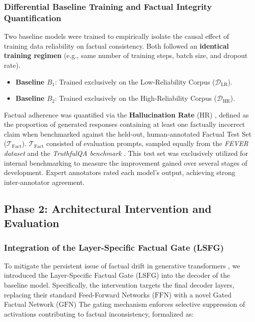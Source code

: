 \subsubsection{Differential Baseline Training and Factual Integrity Quantification}
\label{sec:baseline_training_quantification}
Two baseline models were trained to empirically isolate the causal effect of training data reliability on factual consistency. Both followed an \textbf{identical training regimen} (e.g., same number of training steps, batch size, and dropout rate).

\begin{itemize}
    \item \textbf{Baseline $B_1$}: Trained exclusively on the Low-Reliability Corpus ($\mathcal{D}_{\text{LR}}$).
    \item \textbf{Baseline $B_2$}: Trained exclusively on the High-Reliability Corpus ($\mathcal{D}_{\text{HR}}$).
\end{itemize}

Factual adherence was quantified via the \textbf{Hallucination Rate} ($\text{HR}$) \cite{islam2024comprehensive, cossio2025comprehensive}, defined as the proportion of generated responses containing at least one factually incorrect claim when benchmarked against the held-out, human-annotated Factual Test Set ($\mathcal{T}_{\text{Fact}}$). $\mathcal{T}_{\text{Fact}}$ consisted of evaluation prompts, sampled equally from the \textit{FEVER dataset} \cite{thorne2018fever} and the \textit{TruthfulQA benchmark} \cite{lin2021truthfulqa}. This test set was exclusively utilized for internal benchmarking to measure the improvement gained over several stages of development. Expert annotators rated each model's output, achieving strong inter-annotator agreement.

\subsection{Phase 2: Architectural Intervention and Evaluation}
\label{sec:phase2_intervention}

\subsubsection{Integration of the Layer-Specific Factual Gate (LSFG)}
\label{sec:lsfg_integration}
To mitigate the persistent issue of factual drift in generative transformers \cite{islam2024comprehensive, cossio2025comprehensive}, we introduced the Layer-Specific Factual Gate ($\text{LSFG}$) into the decoder of the baseline model. Specifically, the intervention targets the final decoder layers, replacing their standard Feed-Forward Networks ($\text{FFN}$) \cite{vaswani2017attention} with a novel Gated Factual Network ($\text{GFN}$) The gating mechanism enforces selective suppression of activations contributing to factual inconsistency, formalized as:

